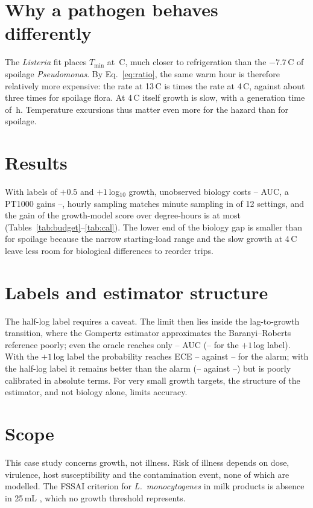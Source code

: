 \documentclass[11pt,a4paper,twoside,openany]{book}
\newcommand{\degC}{\,\textdegree C}
\theoremstyle{plain}\newtheorem{proposition}{Proposition}\newtheorem{corollary}{Corollary}
\theoremstyle{definition}\newtheorem{definition}{Definition}[chapter]
\begin{document}
\section{Why a pathogen behaves differently}
The \textit{Listeria} fit places $T_{\min}$ at \NumLisT\degC, much closer to refrigeration than the $-7.7$\degC{} of spoilage \textit{Pseudomonas}. By Eq.~\eqref{eq:ratio}, the same warm hour is therefore relatively more expensive: the rate at 13\degC{} is \NumLisRatio{} times the rate at 4\degC, against about three times for spoilage flora. At 4\degC{} itself growth is slow, with a generation time of \NumLisGen\,h. Temperature excursions thus matter even more for the hazard than for spoilage.

\section{Results}
With labels of $+0.5$ and $+1$\,log$_{10}$ growth, unobserved biology costs \NumLisGapMin--\NumLisGapMax{} AUC, a PT1000 gains \NumLisSensMin--\NumLisSensMax, hourly sampling matches minute sampling in \NumLisSampNull{} of 12 settings, and the gain of the growth-model score over degree-hours is at most \NumLisGainMax{} (Tables~\ref{tab:budget}--\ref{tab:cal}). The lower end of the biology gap is smaller than for spoilage because the narrow starting-load range and the slow growth at 4\degC{} leave less room for biological differences to reorder trips.

\section{Labels and estimator structure}
The half-log label requires a caveat. The limit then lies inside the lag-to-growth transition, where the Gompertz estimator approximates the Baranyi--Roberts reference poorly; even the oracle reaches only \NumLisOrcAMin--\NumLisOrcAMax{} AUC (\NumLisOrcBMin--\NumLisOrcBMax{} for the $+1$\,log label). With the $+1$\,log label the probability reaches ECE \NumLisEceBMMin--\NumLisEceBMMax{} against \NumLisEceBPMin--\NumLisEceBPMax{} for the alarm; with the half-log label it remains better than the alarm (\NumLisEceAMMin--\NumLisEceAMMax{} against \NumLisEceAPMin--\NumLisEceAPMax) but is poorly calibrated in absolute terms. For very small growth targets, the structure of the estimator, and not biology alone, limits accuracy.

\section{Scope}
This case study concerns growth, not illness. Risk of illness depends on dose, virulence, host susceptibility and the contamination event, none of which are modelled. The FSSAI criterion for \textit{L.~monocytogenes} in milk products is absence in 25\,mL \cite{fssai2024}, which no growth threshold represents.
\end{document}
